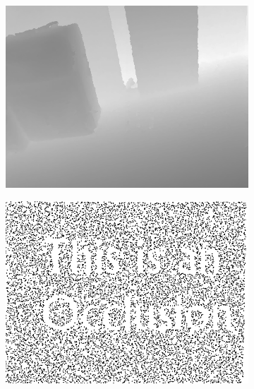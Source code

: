 \documentclass[preprint,10pt,5p,times,twocolumn]{elsarticle}
\begin{document}
\begin{figure}[t]
\begin{center}
\begin{subfigure}[b]{0.136\linewidth}
    \includegraphics[width=\linewidth]{case_structure_missing_inpainting.png}
    \caption{}
    \label{fig:structure_missing_inpainting}
\end{subfigure}
\begin{subfigure}[b]{0.136\linewidth}
    \includegraphics[width=\linewidth]{case_random_missing_depth.png}
    \caption{}
    \label{fig:random_missing_depth}
\end{subfigure}
\begin{subfigure}[b]{0.136\linewidth}

\end{subfigure}
\end{center}
\end{figure}
\end{document}
